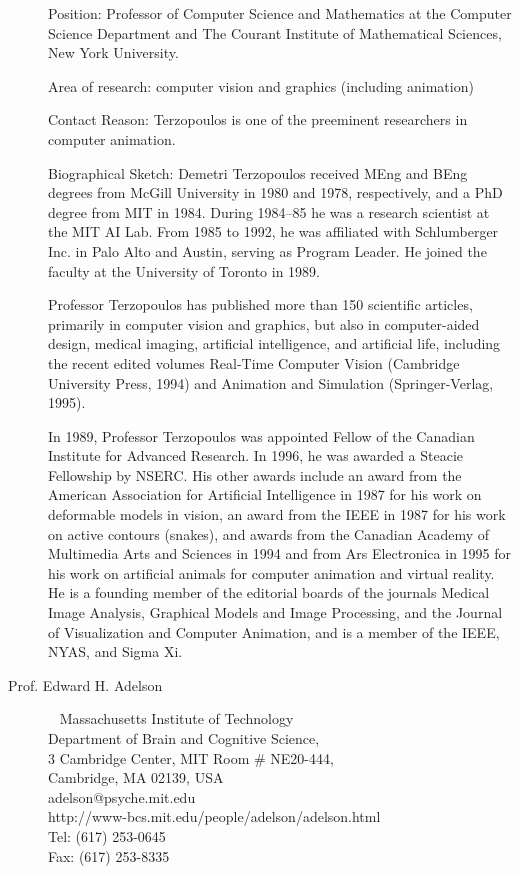\documentclass{gtcv}
\begin{document}
\begin{description}
\medskip
Position:  Professor of Computer Science and Mathematics at the
Computer Science Department and The Courant Institute of
Mathematical Sciences, New York University.

Area of research: computer vision and graphics (including
animation)

Contact Reason:  Terzopoulos is one of the preeminent researchers
in computer animation.

\smallskip
Biographical Sketch: Demetri Terzopoulos received MEng and BEng
degrees from McGill University in 1980 and 1978, respectively, and
a PhD degree from MIT in 1984. During 1984--85 he was a research
scientist at the MIT AI Lab. From 1985 to 1992, he was affiliated
with Schlumberger Inc. in Palo Alto and Austin, serving as Program
Leader. He joined the faculty at the University of Toronto in
1989.

Professor Terzopoulos has published more than 150 scientific
articles, primarily in computer vision and graphics, but also in
computer-aided design, medical imaging, artificial intelligence,
and artificial life, including the recent edited volumes Real-Time
Computer Vision (Cambridge University Press, 1994) and Animation
and Simulation (Springer-Verlag, 1995).

In 1989, Professor Terzopoulos was appointed Fellow of the
Canadian Institute for Advanced Research. In 1996, he was awarded
a Steacie Fellowship by NSERC. His other awards include an award
from the American Association for Artificial Intelligence in 1987
for his work on deformable models in vision, an award from the
IEEE in 1987 for his work on active contours (snakes), and awards
from the Canadian Academy of Multimedia Arts and Sciences in 1994
and from Ars Electronica in 1995 for his work on artificial
animals for computer animation and virtual reality. He is a
founding member of the editorial boards of the journals Medical
Image Analysis, Graphical Models and Image Processing, and the
Journal of Visualization and Computer Animation, and is a member
of the IEEE, NYAS, and Sigma Xi.

\item[Prof. Edward H. Adelson]~
Massachusetts Institute of Technology\\
Department of Brain and Cognitive Science, \\
3 Cambridge Center, MIT Room \# NE20-444, \\
Cambridge, MA 02139, USA\\
adelson@psyche.mit.edu\\
http://www-bcs.mit.edu/people/adelson/adelson.html\\
Tel: (617) 253-0645\\
Fax: (617) 253-8335\\


\end{description}
\end{document}
